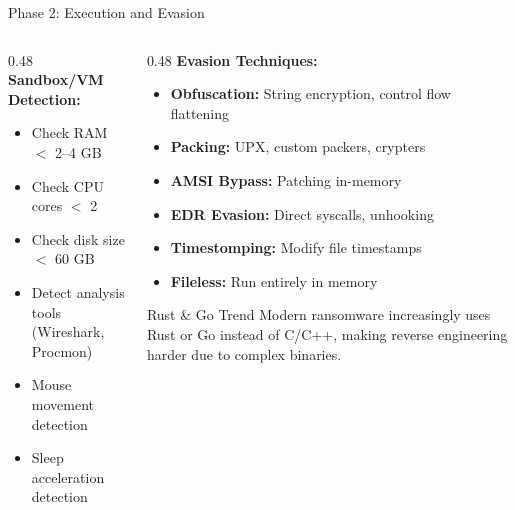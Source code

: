 \documentclass[aspectratio=169]{beamer}
\begin{document}
\begin{frame}{Phase 2: Execution and Evasion}
\begin{columns}[T]
\begin{column}{0.48\textwidth}
      \vspace{0.5em}
      \textbf{Sandbox/VM Detection:}
      \begin{itemize}
        \item Check RAM $<$ 2--4 GB
        \item Check CPU cores $<$ 2
        \item Check disk size $<$ 60 GB
        \item Detect analysis tools (Wireshark, Procmon)
        \item Mouse movement detection
        \item Sleep acceleration detection
      \end{itemize}
    \end{column}
    \begin{column}{0.48\textwidth}
      \textbf{Evasion Techniques:}
      \begin{itemize}
        \item \textbf{Obfuscation:} String encryption, control flow flattening
        \item \textbf{Packing:} UPX, custom packers, crypters
        \item \textbf{AMSI Bypass:} Patching in-memory
        \item \textbf{EDR Evasion:} Direct syscalls, unhooking
        \item \textbf{Timestomping:} Modify file timestamps
        \item \textbf{Fileless:} Run entirely in memory
      \end{itemize}

      \vspace{0.5em}
      \begin{warnbox}{Rust \& Go Trend}
        Modern ransomware increasingly uses Rust or Go instead of C/C++, making reverse engineering harder due to complex binaries.
      \end{warnbox}
    \end{column}
  \end{columns}
\end{frame}
\end{document}
